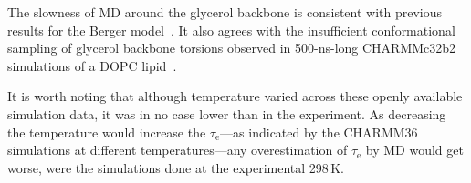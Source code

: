 \documentclass[journal=jpcbfk,manuscript=article,layout=twocolumn]{achemso}
\begin{document}
The slowness of MD around the glycerol backbone is consistent with previous results for the Berger model~\cite{ferreira15}. It also agrees with the insufficient conformational sampling of glycerol backbone torsions observed in 500-ns-long CHARMMc32b2~\cite{schlenkrich96,feller00} simulations of a DOPC lipid~\cite{vogel12}. %


It is worth noting that although temperature varied across these openly available simulation data, it was in no case lower than in the experiment. %
As decreasing the temperature would increase the
$\tau_\mathrm{e}$---as indicated by the CHARMM36 simulations at different temperatures---any
overestimation of $\tau_\mathrm{e}$ by MD would get worse, were the simulations done at the experimental 298\,K.
\end{document}
